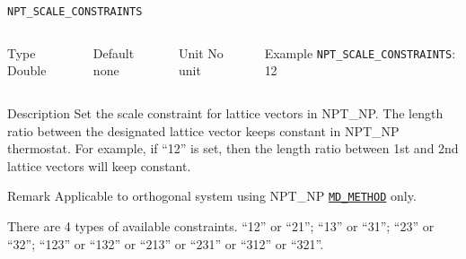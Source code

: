\begin{frame}[allowframebreaks]{\texttt{NPT\_SCALE\_CONSTRAINTS}} \label{NPT_SCALE_CONSTRAINTS}
\vspace*{-12pt}
\begin{columns}
\begin{block}{Type}
Double
\end{block}

\begin{block}{Default}
none
\end{block}

\begin{block}{Unit}
No unit
\end{block}

\begin{block}{Example}
\texttt{NPT\_SCALE\_CONSTRAINTS}: 12
\end{block}
\end{columns}

\begin{block}{Description}
Set the scale constraint for lattice vectors in NPT\_NP. The length ratio between the designated lattice vector keeps constant in NPT\_NP thermostat. For example, if ``12'' is set, then the length ratio between 1st and 2nd lattice vectors will keep constant.
\end{block}

\begin{block}{Remark}
Applicable to orthogonal system using NPT\_NP \hyperlink{MD_METHOD}{\texttt{MD\_METHOD}} only.

There are 4 types of available constraints. ``12'' or ``21''; ``13'' or ``31''; ``23'' or ``32''; ``123'' or ``132'' or ``213'' or ``231'' or ``312'' or ``321''.
\end{block}

\end{frame}



